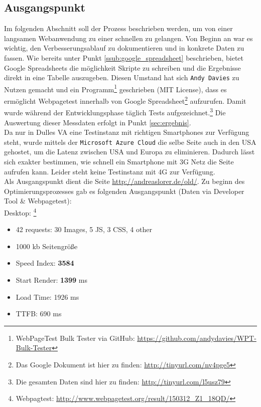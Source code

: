 	\subsection{Ausgangspunkt}
	\label{sub:ausgangspunkt}
		Im folgenden Abschnitt soll der Prozess beschrieben werden, um von einer langsamen Webanwendung zu einer schnellen zu gelangen. Von Beginn an war es wichtig, den Verbesserungsablauf zu dokumentieren und in konkrete Daten zu fassen. Wie bereits unter Punkt \ref{ssub:google_spreadsheet} beschrieben, bietet Google Spreadsheets die möglichkeit Skripte zu schreiben und die Ergebnisse direkt in eine Tabelle auszugeben. Diesen Umstand hat sich \texttt{Andy Davies} zu Nutzen gemacht und ein Programm\footnote{WebPageTest Bulk Tester via GitHub: \url{https://github.com/andydavies/WPT-Bulk-Tester}} geschrieben (MIT License), dass es ermöglicht Webpagetest innerhalb von Google Spreadsheet\footnote{Das Google Dokument ist hier zu finden: \url{http://tinyurl.com/nv4pge5}} aufzurufen. Damit wurde während der Entwicklungsphase täglich Tests aufgezeichnet.\footnote{Die gesamten Daten sind hier zu finden: \url{http://tinyurl.com/l5usz79}} Die Auswertung dieser Messdaten erfolgt in Punkt \ref{sec:ergebnis}.\\

		Da nur in Dulles VA eine Testinstanz mit richtigen Smartphones zur Verfügung steht, wurde mittels der \texttt{Microsoft Azure Cloud} die selbe Seite auch in den USA gehostet, um die Latenz zwischen USA und Europa zu eliminieren. Dadurch lässt sich exakter bestimmen, wie schnell ein Smartphone mit 3G Netz die Seite aufrufen kann. Leider steht keine Testinstanz mit 4G zur Verfügung.\\

		Als Ausgangspunkt dient die Seite \url{http://andreaslorer.de/old/}. Zu beginn des Optimierungsprozesses gab es folgenden Ausgangspunkt (Daten via Developer Tool \& Webpagetest):\\

		Desktop: \footnote{Webpagtest: \url{http://www.webpagetest.org/result/150312_Z1_18QD/}}
		\begin{itemize}
			\item 42 requests: 30 Images, 5 JS, 3 CSS, 4 other
			\item 1000 kb Seitengröße
			\item Speed Index: \textbf{3584}
			\item Start Render: \textbf{1399}  ms
			\item Load Time: 1926 ms
			\item TTFB: 690 ms
		\end{itemize}

